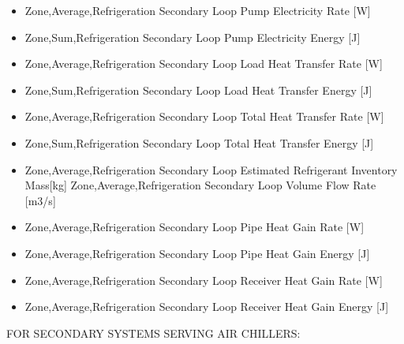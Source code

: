 \begin{itemize}
\item
  Zone,Average,Refrigeration Secondary Loop Pump Electricity Rate {[}W{]}
\item
  Zone,Sum,Refrigeration Secondary Loop Pump Electricity Energy {[}J{]}
\item
  Zone,Average,Refrigeration Secondary Loop Load Heat Transfer Rate {[}W{]}
\item
  Zone,Sum,Refrigeration Secondary Loop Load Heat Transfer Energy {[}J{]}
\item
  Zone,Average,Refrigeration Secondary Loop Total Heat Transfer Rate {[}W{]}
\item
  Zone,Sum,Refrigeration Secondary Loop Total Heat Transfer Energy {[}J{]}
\item
  Zone,Average,Refrigeration Secondary Loop Estimated Refrigerant Inventory Mass{[}kg{]} Zone,Average,Refrigeration Secondary Loop Volume Flow Rate {[}m3/s{]}
\item
  Zone,Average,Refrigeration Secondary Loop Pipe Heat Gain Rate {[}W{]}
\item
  Zone,Average,Refrigeration Secondary Loop Pipe Heat Gain Energy {[}J{]}
\item
  Zone,Average,Refrigeration Secondary Loop Receiver Heat Gain Rate {[}W{]}
\item
  Zone,Average,Refrigeration Secondary Loop Receiver Heat Gain Energy {[}J{]}
\end{itemize}

FOR SECONDARY SYSTEMS SERVING AIR CHILLERS:

